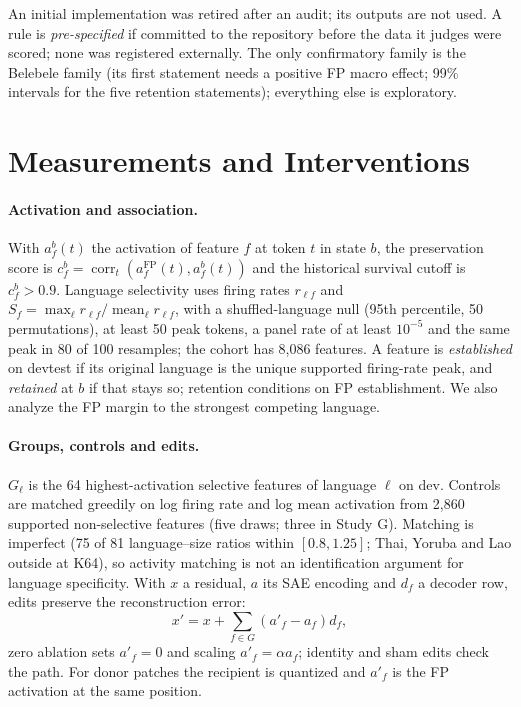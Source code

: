 An initial implementation was retired after an audit; its outputs are not used. A rule is \emph{pre-specified} if committed to the repository before the data it judges were scored; none was registered externally. The only confirmatory family is the Belebele family (its first statement needs a positive FP macro effect; 99\% intervals for the five retention statements); everything else is exploratory.

\section{Measurements and Interventions}
\paragraph{Activation and association.}
With $a_f^b(t)$ the activation of feature $f$ at token $t$ in state $b$, the preservation score is $c_f^b=\operatorname{corr}_t(a_f^{\mathrm{FP}}(t),a_f^b(t))$ and the historical survival cutoff is $c_f^b>0.9$. Language selectivity uses firing rates $r_{\ell f}$ and $S_f=\max_\ell r_{\ell f}/\operatorname{mean}_\ell r_{\ell f}$, with a shuffled-language null (95th percentile, 50 permutations), at least 50 peak tokens, a panel rate of at least $10^{-5}$ and the same peak in 80 of 100 resamples; the cohort has 8,086 features. A feature is \emph{established} on devtest if its original language is the unique supported firing-rate peak, and \emph{retained} at $b$ if that stays so; retention conditions on FP establishment. We also analyze the FP margin to the strongest competing language.

\paragraph{Groups, controls and edits.}
$G_\ell$ is the 64 highest-activation selective features of language $\ell$ on dev. Controls are matched greedily on log firing rate and log mean activation from 2,860 supported non-selective features (five draws; three in Study G). Matching is imperfect (75 of 81 language--size ratios within $[0.8,1.25]$; Thai, Yoruba and Lao outside at K64), so activity matching is not an identification argument for language specificity. With $x$ a residual, $a$ its SAE encoding and $d_f$ a decoder row, edits preserve the reconstruction error:
\begin{equation}
 x'=x+\sum_{f\in G}(a'_f-a_f)d_f,
 \label{eq:edit}
\end{equation}
zero ablation sets $a'_f=0$ and scaling $a'_f=\alpha a_f$; identity and sham edits check the path. For donor patches the recipient is quantized and $a'_f$ is the FP activation at the same position.

